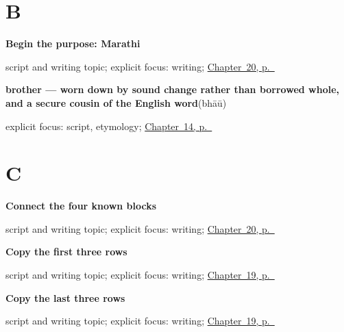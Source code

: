 \section*{B}

\noindent\begin{minipage}[t]{\linewidth}
\raggedright
\textbf{Begin the purpose: Marathi}\par
\footnotesize script and writing topic; explicit focus: writing; \hyperref[ch:mr-a1-named-reader-message]{Chapter~20, p.~\pageref*{ch:mr-a1-named-reader-message}}
\end{minipage}\par\smallskip

\noindent\begin{minipage}[t]{\linewidth}
\raggedright
\textbf{brother — worn down by sound change rather than borrowed whole, and a secure cousin of the English word}\enspace\emph{}\enspace(bhāū)\par
\footnotesize explicit focus: script, etymology; \hyperref[ch:mr-friend-and-family]{Chapter~14, p.~\pageref*{ch:mr-friend-and-family}}
\end{minipage}\par\smallskip

\section*{C}

\noindent\begin{minipage}[t]{\linewidth}
\raggedright
\textbf{Connect the four known blocks}\par
\footnotesize script and writing topic; explicit focus: writing; \hyperref[ch:mr-a1-named-reader-message]{Chapter~20, p.~\pageref*{ch:mr-a1-named-reader-message}}
\end{minipage}\par\smallskip

\noindent\begin{minipage}[t]{\linewidth}
\raggedright
\textbf{Copy the first three rows}\par
\footnotesize script and writing topic; explicit focus: writing; \hyperref[ch:mr-a1-form-labels]{Chapter~19, p.~\pageref*{ch:mr-a1-form-labels}}
\end{minipage}\par\smallskip

\noindent\begin{minipage}[t]{\linewidth}
\raggedright
\textbf{Copy the last three rows}\par
\footnotesize script and writing topic; explicit focus: writing; \hyperref[ch:mr-a1-form-labels]{Chapter~19, p.~\pageref*{ch:mr-a1-form-labels}}
\end{minipage}\par\smallskip

